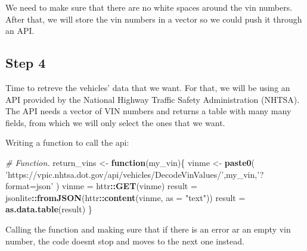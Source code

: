 \documentclass[]{book}
\newenvironment{Shaded}{\begin{snugshade}}{\end{snugshade}}
\newcommand{\CommentTok}[1]{\textcolor[rgb]{0.56,0.35,0.01}{\textit{#1}}}
\newcommand{\ControlFlowTok}[1]{\textcolor[rgb]{0.13,0.29,0.53}{\textbf{#1}}}
\newcommand{\DataTypeTok}[1]{\textcolor[rgb]{0.13,0.29,0.53}{#1}}
\newcommand{\KeywordTok}[1]{\textcolor[rgb]{0.13,0.29,0.53}{\textbf{#1}}}
\newcommand{\NormalTok}[1]{#1}
\newcommand{\OperatorTok}[1]{\textcolor[rgb]{0.81,0.36,0.00}{\textbf{#1}}}
\newcommand{\StringTok}[1]{\textcolor[rgb]{0.31,0.60,0.02}{#1}}
\begin{document}
We need to make sure that there are no white spaces around the vin numbers. After that, we will store the vin numbers in a vector so we could push it through an API.

\begin{Shaded}
\end{Shaded}

\hypertarget{step-4}{%
\subsection{Step 4}\label{step-4}}

Time to retreve the vehicles' data that we want. For that, we will be using an API provided by the National Highway Traffic Safety Administration (NHTSA). The API needs a vector of VIN numbers and returns a table with many many fields, from which we will only select the ones that we want.

Writing a function to call the api:

\begin{Shaded}
\begin{Highlighting}[]
\CommentTok{# Function.}
\NormalTok{return_vins <-}\StringTok{  }\ControlFlowTok{function}\NormalTok{(my_vin)\{}
\NormalTok{  vinme <-}\StringTok{ }
\StringTok{    }\KeywordTok{paste0}\NormalTok{(}
      \StringTok{'https://vpic.nhtsa.dot.gov/api/vehicles/DecodeVinValues/'}\NormalTok{,my_vin,}\StringTok{'?format=json'}
\NormalTok{      )}
\NormalTok{  vinme =}\StringTok{ }\NormalTok{httr}\OperatorTok{::}\KeywordTok{GET}\NormalTok{(vinme)}
\NormalTok{  result =}\StringTok{ }\NormalTok{jsonlite}\OperatorTok{::}\KeywordTok{fromJSON}\NormalTok{(httr}\OperatorTok{::}\KeywordTok{content}\NormalTok{(vinme, }\DataTypeTok{as =} \StringTok{"text"}\NormalTok{)) }
\NormalTok{  result =}\StringTok{ }\KeywordTok{as.data.table}\NormalTok{(result)}
\NormalTok{\}}
\end{Highlighting}
\end{Shaded}

Calling the function and making sure that if there is an error ar an empty vin number, the code doesnt stop and moves to the next one instead.
\end{document}
